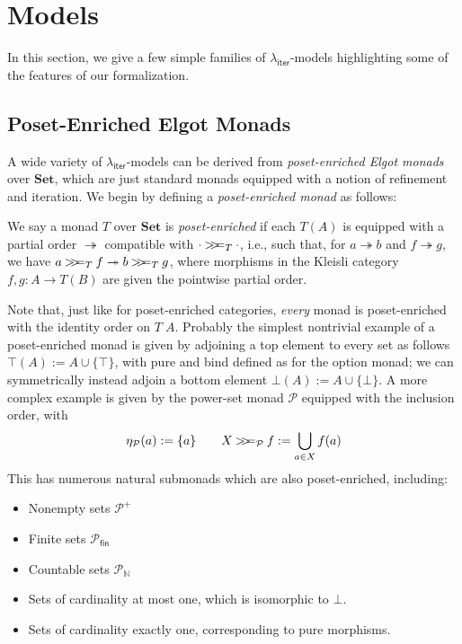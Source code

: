 \documentclass[acmsmall,screen,review]{acmart}
\newcommand{\mc}[1]{\ensuremath{\mathcal{#1}}}
\newcommand{\mb}[1]{\ensuremath{\mathbf{#1}}}
\newcommand{\ms}[1]{\ensuremath{\mathsf{#1}}}
\newcommand{\nats}{\mathbb{N}}
\newcommand{\tref}{\twoheadrightarrow}
\newcommand{\subiterexp}{\texorpdfstring{\(\lambda_{\ms{iter}}\)}{lambda-iter}}
\newcommand{\obind}{\mathbin{>\!\!>\mkern-6.7mu=}}
\newcommand{\mbind}[3]{#2 \obind_{#1} #3}
\begin{document}
\section{Models}

\label{apx:models}

In this section, we give a few simple families of \subiterexp{}-models highlighting some of the
features of our formalization.

\subsection{Poset-Enriched Elgot Monads}

A wide variety of \subiterexp{}-models can be derived from \emph{poset-enriched Elgot monads} over
$\mb{Set}$, which are just standard monads equipped with a notion of refinement and iteration. We
begin by defining a \emph{poset-enriched monad} as follows:
\begin{definition}
  We say a monad $T$ over $\mb{Set}$ is \emph{poset-enriched} if each $T(A)$ is equipped with a
  partial order $\tref$ compatible with $\mbind{T}{\cdot}{\cdot}$, i.e., such that, for $a \tref b$
  and $f \tref g$, we have $\mbind{T}{a}{f} \tref \mbind{T}{b}{g}$, where morphisms in the Kleisli
  category $f, g : A \to T(B)$ are given the pointwise partial order.
\end{definition}
Note that, just like for poset-enriched categories, \emph{every} monad is poset-enriched with the
identity order on $T\;A$. Probably the simplest nontrivial example of a poset-enriched monad is
given by adjoining a top element to every set as follows $\top(A) := A \cup \{\top\}$, with pure and
bind defined as for the option monad; we can symmetrically instead adjoin a bottom element $\bot(A)
:= A \cup \{\bot\}$. A more complex example is given by the power-set monad $\mc{P}$ equipped with
the inclusion order, with
\begin{equation}
  \eta_{\mc{P}}(a) := \{a\} \qquad
  \mbind{\mc{P}}{X}{f} := \bigcup_{a \in X}f(a) 
\end{equation}
This has numerous natural submonads which are also poset-enriched, including:
\begin{itemize}
  \item Nonempty sets $\mc{P}^+$
  \item Finite sets $\mc{P}_{\ms{fin}}$
  \item Countable sets $\mc{P}_{\nats}$
  \item Sets of cardinality at most one, which is isomorphic to $\bot$.
  \item Sets of cardinality exactly one, corresponding to pure morphisms.
\end{itemize}
\end{document}
